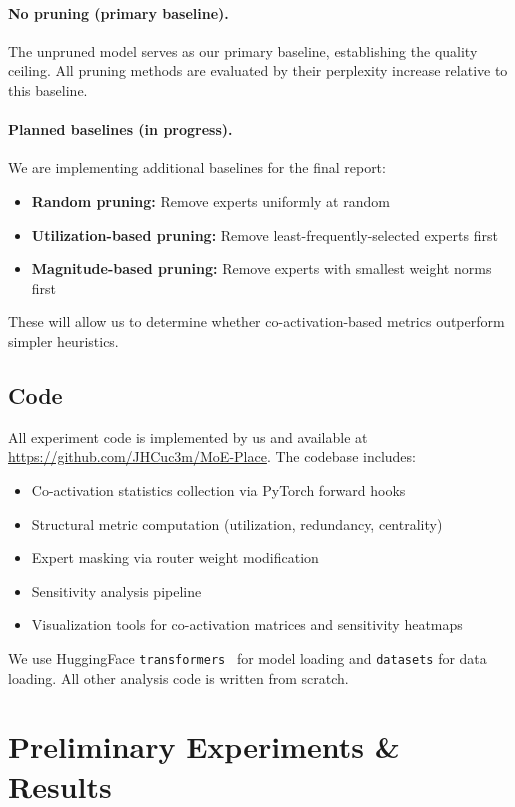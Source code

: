 \documentclass{article}
\begin{document}
\paragraph{No pruning (primary baseline).}
The unpruned model serves as our primary baseline, establishing the quality ceiling.
All pruning methods are evaluated by their perplexity increase relative to this baseline.

\paragraph{Planned baselines (in progress).}
We are implementing additional baselines for the final report:
\begin{itemize}
    \item \textbf{Random pruning:} Remove experts uniformly at random
    \item \textbf{Utilization-based pruning:} Remove least-frequently-selected experts first
    \item \textbf{Magnitude-based pruning:} Remove experts with smallest weight norms first
\end{itemize}
These will allow us to determine whether co-activation-based metrics outperform
simpler heuristics.

\subsection{Code}

All experiment code is implemented by us and available at
\url{https://github.com/JHCuc3m/MoE-Place}.
The codebase includes:
\begin{itemize}
    \item Co-activation statistics collection via PyTorch forward hooks
    \item Structural metric computation (utilization, redundancy, centrality)
    \item Expert masking via router weight modification
    \item Sensitivity analysis pipeline
    \item Visualization tools for co-activation matrices and sensitivity heatmaps
\end{itemize}
We use HuggingFace \texttt{transformers}~\citep{wolf2020huggingface} for model loading
and \texttt{datasets} for data loading.
All other analysis code is written from scratch.

\section{Preliminary Experiments \& Results}
\end{document}
